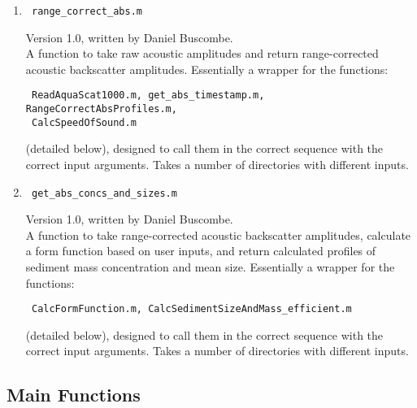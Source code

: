 \documentclass[a4paper,10pt]{report}
\begin{document}
\begin{enumerate}
 \item 
\begin{verbatim} range_correct_abs.m \end{verbatim}
Version 1.0, written by Daniel Buscombe.\\
A function to take raw acoustic amplitudes and return range-corrected acoustic backscatter amplitudes. Essentially a wrapper for the functions:
\begin{verbatim} ReadAquaScat1000.m, get_abs_timestamp.m, RangeCorrectAbsProfiles.m, 
 CalcSpeedOfSound.m \end{verbatim} 
(detailed below), designed to call them in the correct sequence with the correct input arguments. Takes a number of directories with different inputs.

\item
\begin{verbatim} get_abs_concs_and_sizes.m \end{verbatim} 
Version 1.0, written by Daniel Buscombe.\\
A function to take range-corrected acoustic backscatter amplitudes, calculate a form function based on user inputs, and return calculated profiles of sediment mass concentration and mean size. Essentially a wrapper for the functions:
\begin{verbatim} CalcFormFunction.m, CalcSedimentSizeAndMass_efficient.m \end{verbatim}
(detailed below), designed to call them in the correct sequence with the correct input arguments. Takes a number of directories with different inputs.

\end{enumerate}

\subsection{Main Functions}
\end{document}
